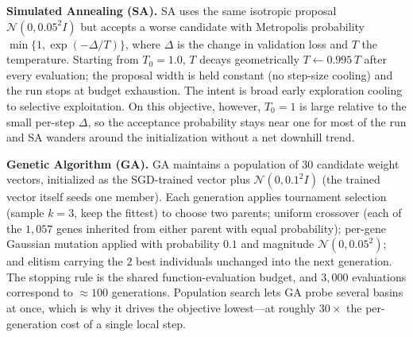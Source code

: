 \documentclass[letterpaper, 10pt, conference]{ieeeconf}
\begin{document}
\textbf{Simulated Annealing (SA).} SA uses the same isotropic proposal
$\mathcal{N}(0,0.05^2 I)$ but accepts a worse candidate with Metropolis
probability $\min\{1,\exp(-\Delta/T)\}$, where $\Delta$ is the change in
validation loss and $T$ the temperature. Starting from $T_0{=}1.0$, $T$ decays
geometrically $T\!\leftarrow\!0.995\,T$ after every evaluation; the proposal width
is held constant (no step-size cooling) and the run stops at budget exhaustion.
The intent is broad early exploration cooling to selective exploitation. On this
objective, however, $T_0{=}1$ is large relative to the small per-step $\Delta$, so
the acceptance probability stays near one for most of the run and SA wanders
around the initialization without a net downhill trend.

\textbf{Genetic Algorithm (GA).} GA maintains a population of $30$ candidate
weight vectors, initialized as the SGD-trained vector plus $\mathcal{N}(0,0.1^2 I)$
(the trained vector itself seeds one member). Each generation applies tournament
selection (sample $k{=}3$, keep the fittest) to choose two parents; uniform
crossover (each of the $1{,}057$ genes inherited from either parent with equal
probability); per-gene Gaussian mutation applied with probability $0.1$ and
magnitude $\mathcal{N}(0,0.05^2)$; and elitism carrying the $2$ best individuals
unchanged into the next generation. The stopping rule is the shared
function-evaluation budget, and $3{,}000$ evaluations correspond to
$\approx\!100$ generations. Population search lets GA probe several basins at
once, which is why it drives the objective lowest---at roughly $30\times$ the
per-generation cost of a single local step.
\end{document}
